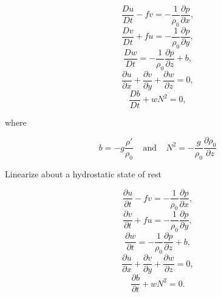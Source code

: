 \documentclass[a4]{seminar}
\begin{document}

\begin{slide}

\begin{displaymath}
\label{B1}
\frac{Du}{Dt} -fv  = - \frac{1}{\rho_0} \frac{\partial p}{\partial x},
\end{displaymath}
\begin{displaymath}
\label{B2}
\frac{Dv}{Dt} +fu  = - \frac{1}{\rho_0} \frac{\partial p}{\partial y},
\end{displaymath}
\begin{displaymath}
\label{B3}
\frac{Dw}{Dt}  = - \frac{1}{\rho_0} \frac{\partial p}{\partial z} + b,
\end{displaymath}
\begin{displaymath}
\label{B4}
\frac{\partial u}{\partial x} +
\frac{\partial v}{\partial y} +
\frac{\partial w}{\partial z} = 0,
\end{displaymath}
\begin{displaymath}
\label{B6}
\frac{D b}{D t} + w N^2 = 0,
\end{displaymath}

where

\begin{displaymath}
b = - g \frac{\rho'}{\rho_0}
\ \ \ \ \ 
\mathrm{and}
\ \ \ \ \ 
N^2 = - \frac{g}{\rho_0} \frac{\partial \rho_0}{\partial z}
\end{displaymath}

\end{slide}


\begin{slide}

Linearize about a hydrostatic state of rest

\begin{displaymath}
\label{LB1}
\frac{\partial u}{\partial t} - f v = - \frac{1}{\rho_0} \frac{\partial p}{\partial x},
\end{displaymath}
\begin{displaymath}
\label{LB2}
\frac{\partial v}{\partial t} + f u = - \frac{1}{\rho_0} \frac{\partial p}{\partial y},
\end{displaymath}
\begin{displaymath}
\label{LB3}
\frac{\partial w}{\partial t} = - \frac{1}{\rho_0} \frac{\partial p}{\partial z} + b,
\end{displaymath}
\begin{displaymath}
\label{LB4}
\frac{\partial u}{\partial x} +
\frac{\partial v}{\partial y} +
\frac{\partial w}{\partial z} = 0,
\end{displaymath}
\begin{displaymath}
\label{LB6}
\frac{\partial b}{\partial t} + w N^2 = 0.
\end{displaymath}


\end{slide}
\end{document}
